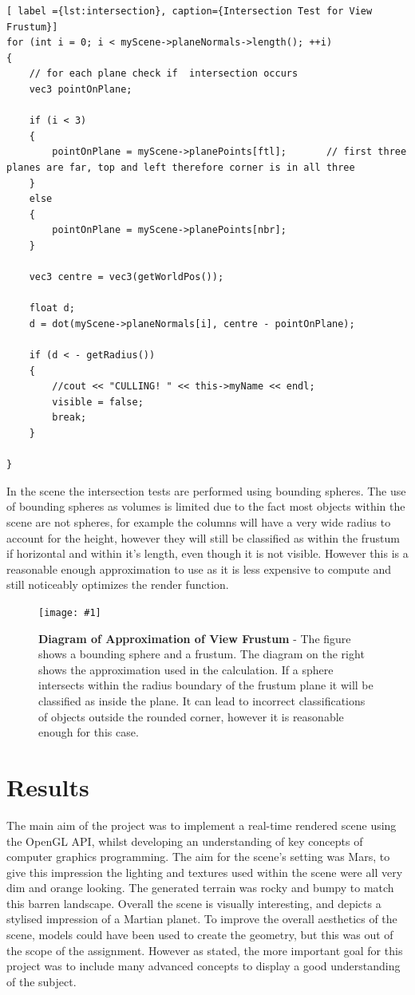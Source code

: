 \documentclass[conference]{acmsiggraph}
\newcommand{\figuremacroW}[4]{
\begin{figure}[h] %
	\centering
	\texttt{[image: \#1]}
	\caption[#2]{\textbf{#2} - #3}
	\label{fig:#1}
\end{figure}
}
\begin{document}
\begin{lstlisting}[ label ={lst:intersection}, caption={Intersection Test for View Frustum}]
for (int i = 0; i < myScene->planeNormals->length(); ++i) 
{
	// for each plane check if 	intersection occurs
	vec3 pointOnPlane;

	if (i < 3)
	{
		pointOnPlane = myScene->planePoints[ftl];		// first three planes are far, top and left therefore corner is in all three
	}
	else
	{	
		pointOnPlane = myScene->planePoints[nbr];
	}

	vec3 centre = vec3(getWorldPos());

	float d;
	d = dot(myScene->planeNormals[i], centre - pointOnPlane);

	if (d < - getRadius())
	{
		//cout << "CULLING! " << this->myName << endl;
		visible = false;
		break;
	}

}
\end{lstlisting}

In the scene the intersection tests are performed using bounding spheres. The use of bounding spheres as volumes is limited due to the fact most objects within the scene are not spheres, for example the columns will have a very wide radius to account for the height, however they will still be classified as within the frustum if horizontal and within it's length, even though it is not visible. However this is a reasonable enough approximation to use as it is less expensive to compute and still noticeably optimizes the render function.

\figuremacroW
{approxFrustum}
{Diagram of Approximation of View Frustum}
{The figure shows a bounding sphere and a frustum. The diagram on the right shows the approximation used in the calculation. If a sphere intersects within the radius boundary of the frustum plane it will be classified as inside the plane. It can lead to incorrect classifications of objects outside the rounded corner, however it is reasonable enough for this case. \cite{RTR}}
{1.0}

\section{Results}

The main aim of the project was to implement a real-time rendered scene using the OpenGL API, whilst developing an understanding of key concepts of computer graphics programming. The aim for the scene's setting was Mars, to give this impression the lighting and textures used within the scene were all very dim and orange looking. The generated terrain was rocky and bumpy to match this barren landscape. Overall the scene is visually interesting, and depicts a stylised impression of a Martian planet. To improve the overall aesthetics of the scene, models could have been used to create the geometry, but this was out of the scope of the assignment. However as stated, the more important goal for this project was to include many advanced concepts to display a good understanding of the subject.
\end{document}
